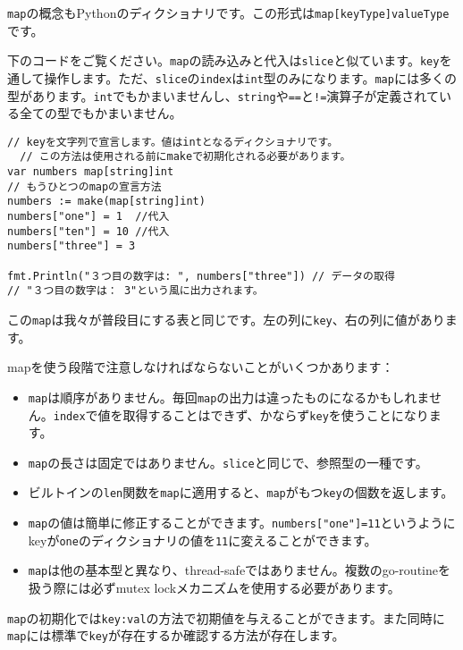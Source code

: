 \texttt{map}の概念もPythonのディクショナリです。この形式は\texttt{map[keyType]valueType}です。

下のコードをご覧ください。\texttt{map}の読み込みと代入は\texttt{slice}と似ています。\texttt{key}を通して操作します。ただ、\texttt{slice}の\texttt{index}は\texttt{int}型のみになります。\texttt{map}には多くの型があります。\texttt{int}でもかまいませんし、\texttt{string}や\texttt{==}と\texttt{!=}演算子が定義されている全ての型でもかまいません。

\begin{lstlisting}[numbers=none]
  // keyを文字列で宣言します。値はintとなるディクショナリです。
  // この方法は使用される前にmakeで初期化される必要があります。
var numbers map[string]int
// もうひとつのmapの宣言方法
numbers := make(map[string]int)
numbers["one"] = 1  //代入
numbers["ten"] = 10 //代入
numbers["three"] = 3

fmt.Println("３つ目の数字は: ", numbers["three"]) // データの取得
// "３つ目の数字は： 3"という風に出力されます。
\end{lstlisting}

この\texttt{map}は我々が普段目にする表と同じです。左の列に\texttt{key}、右の列に値があります。

mapを使う段階で注意しなければならないことがいくつかあります：

\begin{itemize}
\item \texttt{map}は順序がありません。毎回\texttt{map}の出力は違ったものになるかもしれません。\texttt{index}で値を取得することはできず、かならず\texttt{key}を使うことになります。
\item \texttt{map}の長さは固定ではありません。\texttt{slice}と同じで、参照型の一種です。
\item ビルトインの\texttt{len}関数を\texttt{map}に適用すると、\texttt{map}がもつ\texttt{key}の個数を返します。
\item \texttt{map}の値は簡単に修正することができます。\texttt{numbers["one"]=11}というようにkeyが\texttt{one}のディクショナリの値を\texttt{11}に変えることができます。
\item \texttt{map}は他の基本型と異なり、thread-safeではありません。複数のgo-routineを扱う際には必ずmutex lockメカニズムを使用する必要があります。
\end{itemize}

\texttt{map}の初期化では\texttt{key:val}の方法で初期値を与えることができます。また同時に\texttt{map}には標準で\texttt{key}が存在するか確認する方法が存在します。

